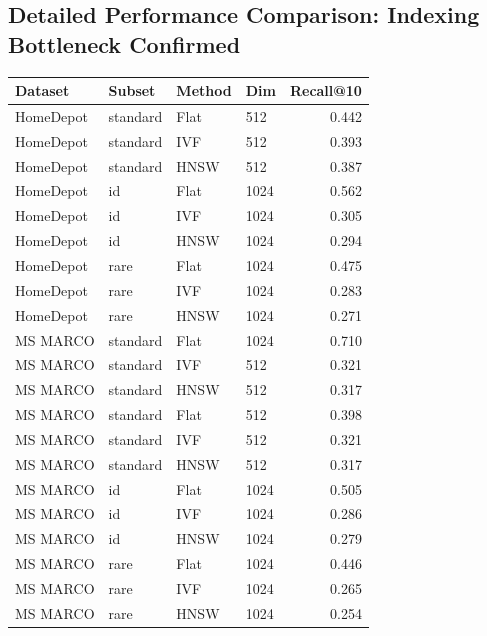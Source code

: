 \documentclass[manuscript]{acmart}
\begin{document}
\subsection{Detailed Performance Comparison: Indexing Bottleneck Confirmed}

\begin{table}[ht]
\centering
\small
\begin{tabular}{llllr}
\toprule
Dataset & Subset & Method & Dim & Recall@10 \\
\midrule
HomeDepot & standard & Flat & 512 & 0.442 \\
HomeDepot & standard & IVF & 512 & 0.393 \\ %
HomeDepot & standard & HNSW & 512 & 0.387 \\ %
\midrule
HomeDepot & id & Flat & 1024 & 0.562 \\
HomeDepot & id & IVF & 1024 & 0.305 \\ %
HomeDepot & id & HNSW & 1024 & 0.294 \\ %
\midrule
HomeDepot & rare & Flat & 1024 & 0.475 \\
HomeDepot & rare & IVF & 1024 & 0.283 \\ %
HomeDepot & rare & HNSW & 1024 & 0.271 \\ %
\midrule
MS MARCO & standard & Flat & 1024 & 0.710 \\ %
MS MARCO & standard & IVF & 512 & 0.321 \\ %
MS MARCO & standard & HNSW & 512 & 0.317 \\ %
MS MARCO & standard & Flat & 512 & 0.398 \\ %
MS MARCO & standard & IVF & 512 & 0.321 \\ %
MS MARCO & standard & HNSW & 512 & 0.317 \\ %
\midrule
MS MARCO & id & Flat & 1024 & 0.505 \\
MS MARCO & id & IVF & 1024 & 0.286 \\ %
MS MARCO & id & HNSW & 1024 & 0.279 \\ %
\midrule
MS MARCO & rare & Flat & 1024 & 0.446 \\
MS MARCO & rare & IVF & 1024 & 0.265 \\ %
MS MARCO & rare & HNSW & 1024 & 0.254 \\ %

\end{tabular}
\end{table}
\end{document}

